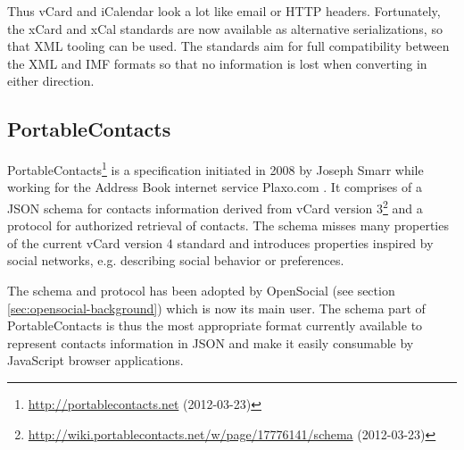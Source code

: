 \documentclass[11pt,a4paper,headsepline,twoside]{scrartcl}		%
\newcommand{\citeurl}[2]{\url{#1} (#2)}
\begin{document}
Thus vCard and iCalendar look a lot like email or HTTP headers. Fortunately, the
xCard \cite{RFC6351} and xCal \cite{RFC6321} standards are now available as
alternative serializations, so that XML tooling can be used. The standards aim
for full compatibility between the XML and IMF formats so that no information is
lost when converting in either direction.



\subsection{PortableContacts}
\label{sec:portablecontacts}

PortableContacts\footnote{\citeurl{http://portablecontacts.net}{2012-03-23}} is
a specification initiated in 2008 by Joseph Smarr while working for the Address
Book internet service
Plaxo.com \cite{Smarr2008}. It
comprises of a JSON schema for contacts information derived from vCard version
3\footnote{\citeurl{http://wiki.portablecontacts.net/w/page/17776141/schema}{2012-03-23}}
and a protocol for authorized retrieval of contacts. The schema misses many
properties of the current vCard version 4 standard \cite{RFC6350} and introduces
properties inspired by social networks, e.g. describing social behavior or
preferences.

The schema and protocol has been adopted by OpenSocial (see section
\ref{sec:opensocial-background}) which is now its main user. The schema part of
PortableContacts is thus the most appropriate format currently available to
represent contacts information in JSON and make it easily consumable by
JavaScript browser applications.
\end{document}
